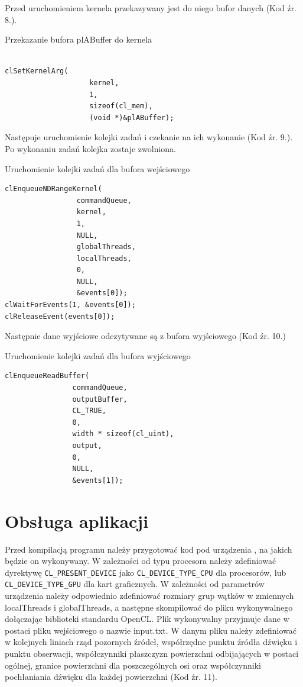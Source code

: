 Przed uruchomieniem kernela przekazywany jest do niego bufor danych (Kod źr. 8.).
\begin{program}
\caption{Przekazanie bufora plABuffer do kernela}
\begin{lstlisting}

clSetKernelArg(
                    kernel, 
                    1, 
                    sizeof(cl_mem), 
                    (void *)&plABuffer);
\end{lstlisting}
\end{program}
Następuje uruchomienie kolejki zadań i czekanie na ich wykonanie (Kod źr. 9.). Po wykonaniu zadań kolejka zostaje zwolniona.
\begin{program}
\caption{Uruchomienie kolejki zadań dla bufora wejściowego}
\begin{lstlisting}
clEnqueueNDRangeKernel(
                 commandQueue,
                 kernel,
                 1,
                 NULL,
                 globalThreads,
                 localThreads,
                 0,
                 NULL,
                 &events[0]);
clWaitForEvents(1, &events[0]);
clReleaseEvent(events[0]);
\end{lstlisting}
\end{program}
Następnie dane wyjściowe odczytywane są z bufora wyjściowego (Kod źr. 10.)
\begin{program}
\caption{Uruchomienie kolejki zadań dla bufora wyjściowego}
\begin{lstlisting}
clEnqueueReadBuffer(
                commandQueue,
                outputBuffer,
                CL_TRUE,
                0,
                width * sizeof(cl_uint),
                output,
                0,
                NULL,
                &events[1]);
\end{lstlisting}
\end{program}



\section{Obsługa aplikacji}\label{sec:oa}

Przed kompilacją programu należy przygotować kod pod urządzenia , na jakich  będzie on wykonywany. W zależności od typu procesora należy zdefiniować dyrektywę \verb|CL_PRESENT_DEVICE| jako \verb|CL_DEVICE_TYPE_CPU| dla procesorów, lub \verb|CL_DEVICE_TYPE_GPU| dla kart graficznych. W zależności od parametrów urządzenia należy odpowiednio zdefiniować rozmiary grup wątków w zmiennych localThreads i globalThreads, a następne skompilować do pliku wykonywalnego dołączając biblioteki standardu OpenCL. Plik wykonywalny przyjmuje dane w postaci pliku wejściowego o nazwie input.txt. W danym pliku należy zdefiniować w kolejnych liniach  rząd pozornych źródeł, współrzędne punktu źródła dźwięku i punktu obserwacji, współczynniki płaszczyzn powierzchni odbijających w postaci ogólnej, granice powierzchni dla poszczególnych osi oraz współczynniki pochłaniania dźwięku dla każdej powierzchni (Kod źr. 11).

